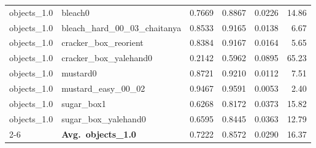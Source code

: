 \begin{longtable}{llrrrr}
  \midrule
  objects_1.0 & bleach0 & 0.7669 & 0.8867 & 0.0226 & 14.86 \\
  objects_1.0 & bleach\_hard\_00\_03\_chaitanya & 0.8533 & 0.9165 & 0.0138 & 6.67 \\
  objects_1.0 & cracker\_box\_reorient & 0.8384 & 0.9167 & 0.0164 & 5.65 \\
  objects_1.0 & cracker\_box\_yalehand0 & 0.2142 & 0.5962 & 0.0895 & 65.23 \\
  objects_1.0 & mustard0 & 0.8721 & 0.9210 & 0.0112 & 7.51 \\
  objects_1.0 & mustard\_easy\_00\_02 & 0.9467 & 0.9591 & 0.0053 & 2.40 \\
  objects_1.0 & sugar\_box1 & 0.6268 & 0.8172 & 0.0373 & 15.82 \\
  objects_1.0 & sugar\_box\_yalehand0 & 0.6595 & 0.8445 & 0.0363 & 12.79 \\
  \cmidrule{2-6}
  & \textbf{Avg.~objects_1.0} & 0.7222 & 0.8572 & 0.0290 & 16.37 \\
  \midrule
\bottomrule
\end{longtable}